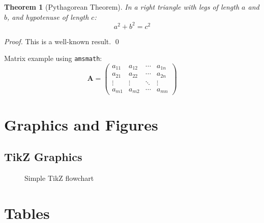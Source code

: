 \documentclass[12pt,a4paper]{article}
\newtheorem{theorem}{Theorem}[section]
\begin{document}
\begin{theorem}[Pythagorean Theorem]
In a right triangle with legs of length $a$ and $b$, and hypotenuse of length $c$:
\begin{equation}
a^2 + b^2 = c^2
\end{equation}
\end{theorem}

\begin{proof}
This is a well-known result. \qed
\end{proof}

Matrix example using \texttt{amsmath}:
\begin{equation}
\mathbf{A} = \begin{pmatrix}
a_{11} & a_{12} & \cdots & a_{1n} \\
a_{21} & a_{22} & \cdots & a_{2n} \\
\vdots & \vdots & \ddots & \vdots \\
a_{m1} & a_{m2} & \cdots & a_{mn}
\end{pmatrix}
\end{equation}

\section{Graphics and Figures}

\subsection{TikZ Graphics}

\begin{figure}[H]
\centering
{}
\caption{Simple TikZ flowchart}
\label{fig:tikz-example}
\end{figure}

\section{Tables}
\end{document}
